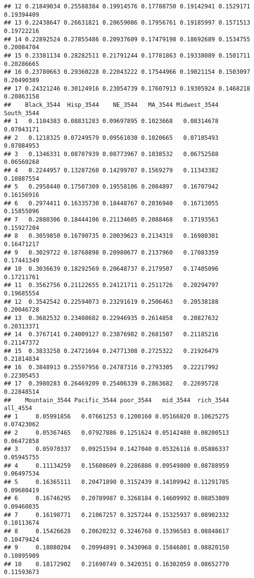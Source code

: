 \documentclass[
]{article}
\begin{document}
\begin{verbatim}
## 12 0.21849034 0.25588384 0.19914576 0.17788750 0.19142941 0.1529171 0.19394409
## 13 0.22438647 0.26631821 0.20659086 0.17956761 0.19185997 0.1571513 0.19722216
## 14 0.22892524 0.27855486 0.20937609 0.17479198 0.18692689 0.1534755 0.20084704
## 15 0.23381134 0.28282511 0.21791244 0.17781863 0.19338089 0.1501711 0.20286665
## 16 0.23780663 0.29360228 0.22043222 0.17544966 0.19021154 0.1503097 0.20490389
## 17 0.24321246 0.30124916 0.23054739 0.17607913 0.19305924 0.1468218 0.20863158
##    Black_3544  Hisp_3544    NE_3544   MA_3544 Midwest_3544 South_3544
## 1   0.1104383 0.08831283 0.09697895 0.1023668   0.08314678 0.07043171
## 2   0.1218325 0.07249579 0.09561030 0.1020665   0.07185493 0.07084953
## 3   0.1346331 0.08707939 0.08773967 0.1038532   0.06752588 0.06560268
## 4   0.2244957 0.13287260 0.14299707 0.1569279   0.11343382 0.10887554
## 5   0.2958440 0.17507309 0.19558106 0.2084897   0.16707942 0.16156916
## 6   0.2974411 0.16335730 0.18448767 0.2036940   0.16713055 0.15855096
## 7   0.2880306 0.18444106 0.21134605 0.2088468   0.17193563 0.15927204
## 8   0.3059850 0.16790735 0.20039623 0.2134319   0.16980301 0.16471217
## 9   0.3029722 0.18768898 0.20980677 0.2137960   0.17083359 0.17441349
## 10  0.3036639 0.18292569 0.20648737 0.2179507   0.17405096 0.17211761
## 11  0.3562756 0.21122655 0.24121711 0.2511726   0.20294797 0.19685554
## 12  0.3542542 0.22594073 0.23291619 0.2506463   0.20538188 0.20046728
## 13  0.3682532 0.23408682 0.22946935 0.2614858   0.20827632 0.20313371
## 14  0.3767141 0.24009127 0.23876982 0.2681507   0.21185216 0.21147372
## 15  0.3833258 0.24721694 0.24771308 0.2725322   0.21926479 0.21814834
## 16  0.3848913 0.25597956 0.24787316 0.2793305   0.22217992 0.22305453
## 17  0.3980283 0.26469209 0.25406339 0.2863682   0.22695728 0.22848514
##    Mountain_3544 Pacific_3544 poor_3544   mid_3544  rich_3544   all_4554
## 1     0.05991856   0.07661253 0.1200160 0.05166820 0.10625275 0.07423062
## 2     0.05367465   0.07927886 0.1251624 0.05142480 0.08200513 0.06472858
## 3     0.05970337   0.09251594 0.1427040 0.05326116 0.05886337 0.05945755
## 4     0.11134259   0.15608609 0.2286886 0.09549800 0.08788959 0.06497534
## 5     0.16365111   0.20471890 0.3152439 0.14109942 0.11291785 0.09680419
## 6     0.16746295   0.20789987 0.3268184 0.14609992 0.08853809 0.09460835
## 7     0.16198771   0.21067257 0.3257244 0.15325937 0.08902332 0.10113674
## 8     0.15426628   0.20620232 0.3246768 0.15396583 0.08848617 0.10479424
## 9     0.18080204   0.20994891 0.3430968 0.15846801 0.08820150 0.10895909
## 10    0.18172902   0.21690749 0.3420351 0.16302059 0.08652770 0.11593673

\end{verbatim}
\end{document}
